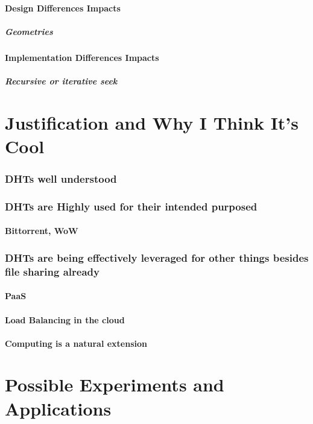 \documentclass[10pt,letterpaper]{report}
\begin{document}
\subsubsection{Design Differences Impacts}
\paragraph{Geometries}
\subsubsection{Implementation Differences Impacts}
\paragraph{Recursive or iterative seek}


\chapter{Justification and Why I Think It's Cool}
\subsection{DHTs well understood}
\subsection{DHTs are Highly used for their intended purposed}
\subsubsection{Bittorrent, WoW}
\subsection{DHTs are being effectively leveraged for other things besides file sharing already}
\subsubsection{PaaS}
\subsubsection{Load Balancing in the cloud}
\subsubsection{Computing is a natural extension}

\chapter{Possible Experiments and Applications}
\end{document}
